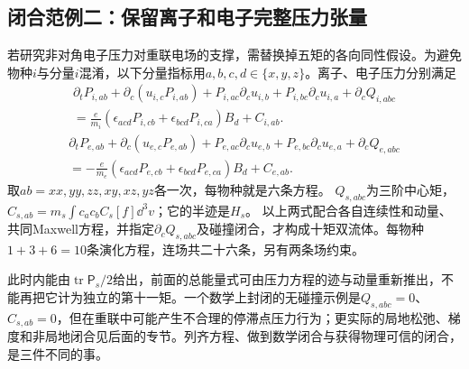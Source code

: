 \subsection{闭合范例二：保留离子和电子完整压力张量}
\label{sec:full-ten-moment}
若研究非对角电子压力对重联电场的支撑，需替换掉五矩的各向同性假设。为避免物种$i$与分量$i$混淆，以下分量指标用$a,b,c,d\in\{x,y,z\}$。离子、电子压力分别满足
\begin{multline}
 \partial_tP_{i,ab}+\partial_c(u_{i,c}P_{i,ab})
 +P_{i,ac}\partial_cu_{i,b}+P_{i,bc}\partial_cu_{i,a}
 +\partial_cQ_{i,abc}\\
 =
 \frac e{m_i}(\epsilon_{acd}P_{i,cb}+\epsilon_{bcd}P_{i,ca})B_d
 +C_{i,ab}.
 \label{eq:ion-pressure-full}
\end{multline}
\begin{multline}
 \partial_tP_{e,ab}+\partial_c(u_{e,c}P_{e,ab})
 +P_{e,ac}\partial_cu_{e,b}+P_{e,bc}\partial_cu_{e,a}
 +\partial_cQ_{e,abc}\\
 =
 -\frac e{m_e}(\epsilon_{acd}P_{e,cb}+\epsilon_{bcd}P_{e,ca})B_d
 +C_{e,ab}.
 \label{eq:electron-pressure-full}
\end{multline}
取$ab=xx,yy,zz,xy,xz,yz$各一次，每物种就是六条方程。
$Q_{s,abc}$为三阶中心矩，
$C_{s,ab}=m_s\int c_ac_bC_s[f]\dd^3v$；它的半迹是$H_s$。
以上两式配合各自连续性和动量、共同Maxwell方程，并指定$\partial_cQ_{s,abc}$及碰撞闭合，才构成十矩双流体。每物种$1+3+6=10$条演化方程，连场共二十六条，另有两条场约束。

此时内能由$\operatorname{tr}\mathsf P_s/2$给出，前面的总能量式可由压力方程的迹与动量重新推出，不能再把它计为独立的第十一矩。一个数学上封闭的无碰撞示例是$Q_{s,abc}=0$、$C_{s,ab}=0$，但在重联中可能产生不合理的停滞点压力行为；更实际的局地松弛、梯度和非局地闭合见后面的专节。列齐方程、做到数学闭合与获得物理可信的闭合，是三件不同的事。\citep{Wang2015,Ng2020}

